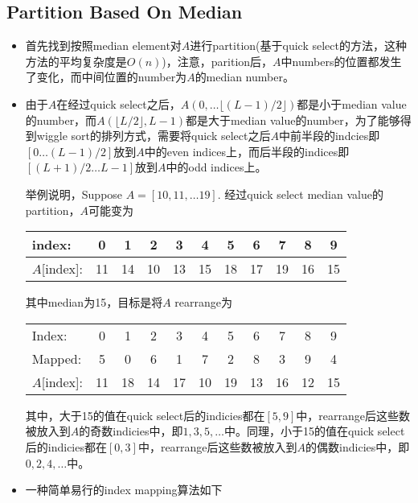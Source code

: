 \subsection{Partition Based On Median}
\begin{itemize}
\item 首先找到按照median element对$A$进行partition(基于quick select的方法，这种方法的平均复杂度是$ O(n) $)，注意，parition后，$A$中numbers的位置都发生了变化，而中间位置的number为$A$的median number。
\item 由于$A$在经过quick select之后，$A(0,\ldots \lfloor (L-1)/2\rfloor)$都是小于median value的number，而$A(\lfloor L/2\rfloor, L-1)$都是大于median value的number，为了能够得到wiggle sort的排列方式，需要将quick select之后$A$中前半段的indcies即$[0\ldots (L-1)/2]$放到$A$中的even indices上，而后半段的indices即$[(L+1)/2\ldots L-1]$放到$A$中的odd indices上。
\par
举例说明，Suppose $ A = [10,11,\ldots 19]$. 经过quick select median value的partition，$A$可能变为
\begin{table}[H]
\begin{tabular}{l*{10}{c}}
index: &  0 &  1 &  2 &  3 &   4 &   5 &  6 &  7 &  8 &   9\\
\hline
$A$[index]:&  11 & 14&  10&  13&   15&   18&  17 & 19&  16&  15
\end{tabular}
\end{table}
其中median为15，目标是将$A$ rearrange为
\begin{table}[H]
\begin{tabular}{l*{10}{c}}
Index: &  0 & 1 & 2 & 3 & 4 & 5 & 6 & 7 & 8 & 9 \\
Mapped: &  5 & 0 & 6 & 1 & 7 & 2 & 8 & 3 & 9 & 4\\
\hline
$A$[index]:&  11 & 18 & 14 & 17 & 10 & 19 & 13 & 16 & 12 & 15
\end{tabular}
\end{table}
其中，大于15的值在quick select后的indicies都在$[5, 9]$中，rearrange后这些数被放入到$A$的奇数indicies中，即$1, 3, 5, \ldots$中。同理，小于15的值在quick select后的indicies都在$[0,3]$中，rearrange后这些数被放入到$A$的偶数indicies中，即$0,2,4,\ldots$中。
\item 一种简单易行的index mapping算法如下


\end{itemize}
